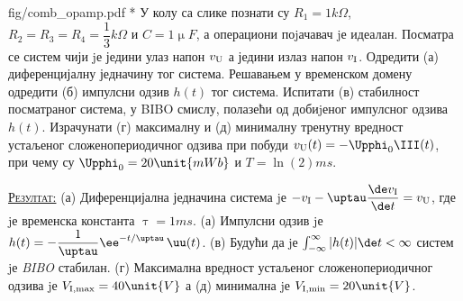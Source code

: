 \begin{slikaDesno}{fig/comb_opamp.pdf}
    {\color{red}*}\PID 
У колу са слике познати су $R_1 = 1\unit{k\Omega}$, 
$R_2 = R_3 = R_4 = \dfrac{1}{3}\unit{k\Omega}$ и 
$C = 1\unit{\upmu F}$, а
операциони поjачавач jе идеалан. 
Посматра се систем чији jе једини улаз напон
$v_{\rm U}$ а једини излаз напон $v_{\rm I}$. 
Одредити 
(а) диференцијалну једначину тог система. Решавањем у временском домену одредити 
(б) импулсни одзив $h(t)$
тог система. Испитати (в) стабилност посматраног система, у BIBO смислу,
полазећи од добиjеног импулсног одзива $h(t)$. 
Израчунати (г) максималну
и (д) минималну тренутну вредност устаљеног сложенопериодичног одзива
при побуди 
$v_{\rm U} (t) = -\Upphi_0 \III(t)$, 
при чему су $\Upphi_0 = 20\unit{mWb}$ и $T = \ln(2)\unit{ms}$.
\end{slikaDesno}
\vspace*{2mm}

\textsc{\underline{Резултат:}}
(а) Диференцијална једначина система jе 
$-v_{\rm I} - \uptau \dfrac{\de v_{\rm I}}{\de t} = v_{\rm U}$, где jе временска константа 
$\uptau = 1\unit{ms}$. 
(а) Импулсни одзив jе $h(t) = -\dfrac{1}{\uptau} \ee^{-t/\uptau}\,\uu(t)$. 
(в) Будући да jе 
$ \int_{-\infty}^{\infty} |h(t)| \de t < \infty$
систем jе \textit{BIBO} стабилан. 
(г) Максимална вредност устаљеног сложенопериодичног одзива jе 
$V_{\rm I,max} = 40\unit{V}$ а (д) 
минимална jе $V_{\rm I,min} = 20\unit{V}$.